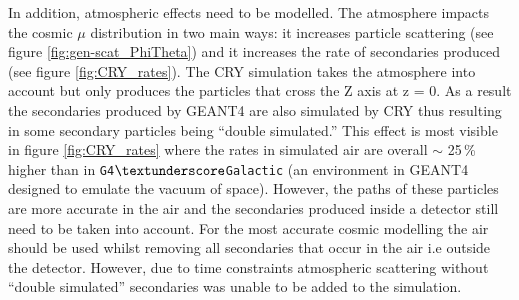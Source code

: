 In addition, atmospheric effects need to be modelled. The atmosphere impacts the cosmic $\mu$ distribution in two main ways: it increases particle scattering (see figure \ref{fig:gen-scat_PhiTheta}) and it increases the rate of secondaries produced (see figure \ref{fig:CRY_rates}). The CRY simulation takes the atmosphere into account \cite{hagmann2007monteCry} but only produces the particles that cross the Z axis at z = 0. As a result the secondaries produced by GEANT4 are also simulated by CRY thus resulting in some secondary particles being ``double simulated.'' This effect is most visible in figure \ref{fig:CRY_rates} where the rates in simulated air are overall $\sim$ 25\,\% higher than in \texttt{G4$\textunderscore$Galactic} (an environment in GEANT4 designed to emulate the vacuum of space). However, the paths of these particles are more accurate in the air and the secondaries produced inside a detector still need to be taken into account. For the most accurate cosmic modelling the air should be used whilst removing all secondaries that occur in the air i.e outside the detector. However, due to time constraints atmospheric scattering without ``double simulated'' secondaries was unable to be added to the simulation. 


